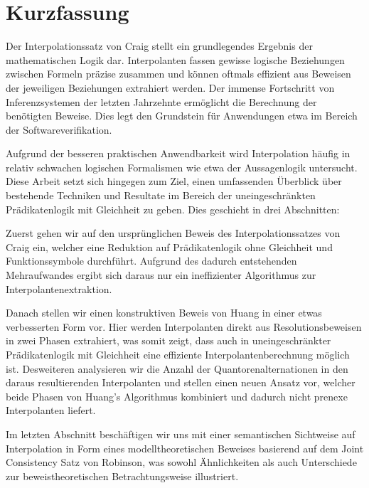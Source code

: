 \chapter*{Kurzfassung}

Der Interpolationssatz von Craig stellt ein grundlegendes Ergebnis der mathematischen Logik dar.
Interpolanten fassen gewisse logische Beziehungen zwischen Formeln präzise zusammen und können oftmals effizient aus Beweisen der jeweiligen Beziehungen extrahiert werden.
Der immense Fortschritt von Inferenzsystemen der letzten Jahrzehnte ermöglicht die Berechnung der benötigten Beweise.
Dies legt den Grundstein für Anwendungen etwa im Bereich der Softwareverifikation.

Aufgrund der besseren praktischen Anwendbarkeit wird Interpolation häufig in relativ schwachen logischen Formalismen wie etwa der Aussagenlogik untersucht.
Diese Arbeit setzt sich hingegen zum Ziel, einen umfassenden Überblick über bestehende Techniken und Resultate im Bereich der uneingeschränkten Prädikatenlogik mit Gleichheit zu geben.
Dies geschieht in drei Abschnitten:

Zuerst gehen wir auf den ursprünglichen Beweis des Interpolationssatzes von Craig ein, welcher eine Reduktion auf Prädikatenlogik ohne Gleichheit und Funktionssymbole durchführt.
Aufgrund des dadurch entstehenden Mehraufwandes ergibt sich daraus nur ein ineffizienter Algorithmus zur Interpolantenextraktion.

Danach stellen wir einen konstruktiven Beweis von Huang in einer etwas verbesserten Form vor.
Hier werden Interpolanten direkt aus Resolutionsbeweisen in zwei Phasen extrahiert, was somit zeigt, dass auch in uneingeschränkter Prädikatenlogik mit Gleichheit eine effiziente Interpolantenberechnung möglich ist.
Desweiteren analysieren wir die Anzahl der Quantorenalternationen in den daraus resultierenden Interpolanten und stellen einen neuen Ansatz vor, welcher beide Phasen von Huang's Algorithmus kombiniert und dadurch nicht prenexe Interpolanten liefert.

Im letzten Abschnitt beschäftigen wir uns mit einer semantischen Sichtweise auf Interpolation in Form eines modelltheoretischen Beweises basierend auf dem Joint Consistency Satz von Robinson, was sowohl Ähnlichkeiten als auch Unterschiede zur beweistheoretischen Betrachtungsweise illustriert.
